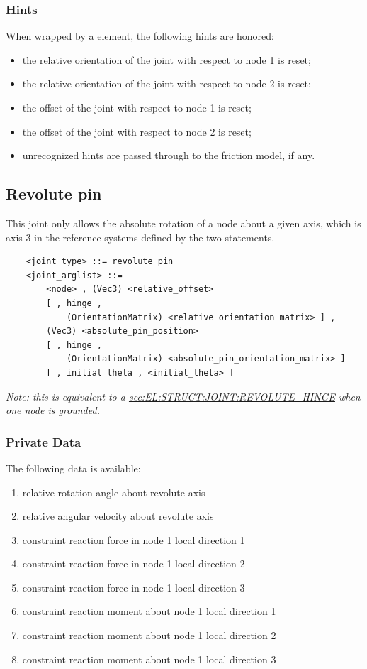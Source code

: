 \subsubsection{Hints}
When wrapped by a  element, the following hints are honored:
\begin{itemize}
\item {} the relative orientation of the joint
with respect to node 1 is reset;
\item {} the relative orientation of the joint
with respect to node 2 is reset;
\item {} the offset of the joint
with respect to node 1 is reset;
\item {} the offset of the joint
with respect to node 2 is reset;
\item unrecognized hints are passed through to the friction model,
if any.
\end{itemize}




\subsection{Revolute pin}
\label{sec:EL:STRUCT:JOINT:REVOLUTE_PIN}
This joint only allows the absolute rotation of a node about
a given axis, which is axis 3 in the reference systems defined 
by the two  statements.
\begin{verbatim}
    <joint_type> ::= revolute pin
    <joint_arglist> ::= 
        <node> , (Vec3) <relative_offset>
        [ , hinge , 
            (OrientationMatrix) <relative_orientation_matrix> ] ,
        (Vec3) <absolute_pin_position>
        [ , hinge , 
            (OrientationMatrix) <absolute_pin_orientation_matrix> ]
        [ , initial theta , <initial_theta> ]
\end{verbatim}
{\em
Note: this is equivalent to a
\hyperref{\kw{revolute hinge}}{\kw{revolute hinge} (see Section~}{)}{sec:EL:STRUCT:JOINT:REVOLUTE_HINGE}
when one node is grounded.
}

\subsubsection{Private Data}
The following data is available:
\begin{enumerate}
\item {} relative rotation angle about revolute axis
\item {} relative angular velocity about revolute axis
\item {} constraint reaction force in node 1 local direction 1
\item {} constraint reaction force in node 1 local direction 2
\item {} constraint reaction force in node 1 local direction 3
\item {} constraint reaction moment about node 1 local direction 1
\item {} constraint reaction moment about node 1 local direction 2
\item {} constraint reaction moment about node 1 local direction 3
\end{enumerate}


